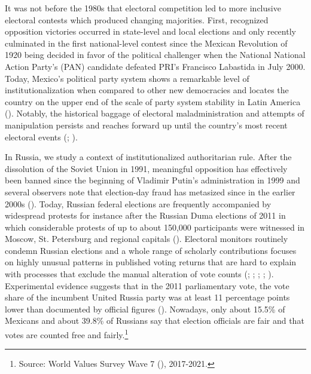\documentclass[11pt, ngerman,english,a4]{article}
\begin{document}
It was not before the 1980s that electoral competition led to more inclusive electoral contests which produced changing majorities. First, recognized opposition victories occurred in state-level and local elections and only recently culminated in the first national-level contest since the Mexican Revolution of 1920 being decided in favor of the political challenger when the National National Action Party’s (PAN) candidate defeated PRI’s Francisco Labastida in July 2000. Today, Mexico’s political party system shows a remarkable level of institutionalization when compared to other new democracies and locates the country on the upper end of the scale of party system stability in Latin America (\citealt{Greene2018}). Notably, the historical baggage of electoral maladministration and attempts of manipulation persists and reaches forward up until the country’s most recent electoral events (\citealt{Cantu2014}; \citealt{Cantu2019a}). 

In Russia, we study a context of institutionalized authoritarian rule. After the dissolution of the Soviet Union in 1991, meaningful opposition has effectively been banned since the beginning of Vladimir Putin’s administration in 1999 and several observers note that election-day fraud has metasized since in the earlier 2000s (\citealt{Myagkov2009}). Today, Russian federal elections are frequently accompanied by widespread protests for instance after the Russian Duma elections of 2011 in which considerable protests of up to about 150,000 participants were witnessed in Moscow, St. Petersburg and regional capitals (\citealt{Robertson2017}). Electoral monitors routinely condemn Russian elections and a whole range of scholarly contributions focuses on highly unusual patterns in published voting returns that are hard to explain with processes that exclude the manual alteration of vote counts (\citealt{Rozenas2017}; \citealt{Klimek2012}; \citealt{Myagkov2009}; \citealt{Jimenez2017}; \citealt{Kobak2016a, Kobak2016b, Kobak2018}). Experimental evidence suggests that in the 2011 parliamentary vote, the vote share of the incumbent United Russia party was at least 11 percentage points lower than documented by official figures (\citet{Enikolopov2013}). Nowadays, only about 15.5\% of Mexicans and about 39.8\% of Russians say that election officials are fair and that votes are counted free and fairly.\footnote{Source: World Values Survey Wave 7 (\citealt{Inglehart2020}), 2017-2021.}

\end{document}
